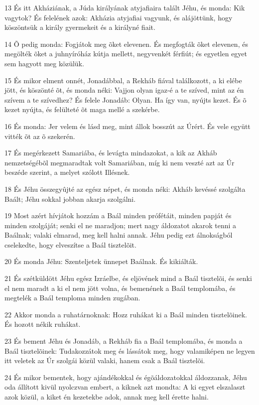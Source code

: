 \par 13 És itt Akháziának, a Júda királyának atyjafiaira talált Jéhu, és monda: Kik vagytok? És felelének azok: Akházia atyjafiai vagyunk, és alájöttünk, hogy köszöntsük a király gyermekeit és a királyné fiait.
\par 14 Õ pedig monda: Fogjátok meg õket elevenen. És megfogták õket elevenen, és megölték õket a juhnyíróház kútja mellett, negyvenkét férfiút; és egyetlen egyet sem hagyott meg közülük.
\par 15 És mikor elment onnét, Jonadábbal, a Rekháb fiával találkozott, a ki elébe jött, és köszönté õt, és monda néki: Vajjon olyan igaz-é a te szíved, mint az én szívem a te szívedhez? És felele Jonadáb: Olyan. Ha így van, nyújts kezet. És õ kezet nyújta, és felülteté õt maga mellé a szekérbe.
\par 16 És monda: Jer velem és lásd meg, mint állok bosszút az Úrért. És vele együtt vitték õt az õ szekerén.
\par 17 És megérkezett Samariába, és levágta mindazokat, a kik az Akháb nemzetségébõl megmaradtak volt Samariában, míg ki nem veszté azt az Úr beszéde szerint, a melyet szólott Illésnek.
\par 18 És Jéhu összegyûjté az egész népet, és monda néki: Akháb kevéssé szolgálta Baált; Jéhu sokkal jobban akarja szolgálni.
\par 19 Most azért hívjátok hozzám a Baál minden prófétáit, minden papját és minden szolgáját; senki el ne maradjon; mert nagy áldozatot akarok tenni a Baálnak; valaki elmarad, meg kell halni annak. Jéhu pedig ezt álnokságból cselekedte, hogy elveszítse a Baál tisztelõit.
\par 20 És monda Jéhu: Szenteljetek ünnepet Baálnak. És kikiálták.
\par 21 És szétküldött Jéhu egész Izráelbe, és eljövének mind a Baál tisztelõi, és senki el nem maradt a ki el nem jött volna, és bemenének a Baál templomába, és megtelék a Baál temploma minden zugában.
\par 22 Akkor monda a ruhatárnoknak: Hozz ruhákat ki a Baál minden tisztelõinek. És hozott nékik ruhákat.
\par 23 És bement Jéhu és Jonadáb, a Rekháb fia a Baál templomába, és monda a Baál tisztelõinek: Tudakozzátok meg és lássátok meg, hogy valamiképen ne legyen itt veletek az Úr szolgái közül valaki, hanem csak a Baál tisztelõi.
\par 24 És mikor bementek, hogy ajándékokkal és égõáldozatokkal áldozzanak, Jéhu oda állított kivül nyolczvan embert, a kiknek azt mondta: A ki egyet elszalaszt azok közül, a kiket én kezetekbe adok, annak meg kell érette halni.

